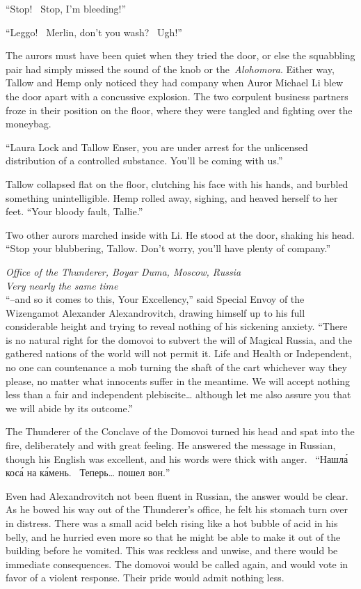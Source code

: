 ``Stop! ~Stop, I'm bleeding!''

``Leggo! ~Merlin, don't you wash? ~Ugh!''

The aurors must have been quiet when they tried the door, or else the
squabbling pair had simply missed the sound of the knob or
the~\emph{Alohomora}. Either way, Tallow and Hemp only noticed they had
company when Auror Michael Li blew the door apart with a concussive
explosion. The two corpulent business partners froze in their position
on the floor, where they were tangled and fighting over the moneybag.

``Laura Lock and Tallow Enser, you are under arrest for the unlicensed
distribution of a controlled substance. You'll be coming with us.''

Tallow collapsed flat on the floor, clutching his face with his hands,
and burbled something unintelligible. Hemp rolled away, sighing, and
heaved herself to her feet. ``Your bloody fault, Tallie.''

Two other aurors marched inside with Li. He stood at the door, shaking
his head. ``Stop your blubbering, Tallow. Don't worry, you'll have
plenty of company.''

\mybreak

\emph{Office of the Thunderer, Boyar Duma, Moscow, Russia}\\
\emph{Very nearly the same time}\\

``--and so it comes to this, Your Excellency,'' said Special Envoy of
the Wizengamot Alexander Alexandrovitch, drawing himself up to his full
considerable height and trying to reveal nothing of his sickening
anxiety. ``There is no natural right for the domovoi to subvert the will
of Magical Russia, and the gathered nations of the world will not permit
it. Life and Health or Independent, no one can countenance a mob turning
the shaft of the cart whichever way they please, no matter what
innocents suffer in the meantime. We will accept nothing less than a
fair and independent plebiscite\ldots{} although let me also assure you
that we will abide by its outcome.''

The Thunderer of the Conclave of the Domovoi turned his head and spat
into the fire, deliberately and with great feeling. He answered the
message in Russian, though his English was excellent, and his words were
thick with anger. ~``\foreignlanguage{russian}{Нашла́ коса́ на ка́мень.
~Теперь\ldots{} пошел вон.}''

Even had Alexandrovitch not been fluent in Russian, the answer would be
clear. As he bowed his way out of the Thunderer's office, he felt his
stomach turn over in distress. There was a small acid belch rising like
a hot bubble of acid in his belly, and he hurried even more so that he
might be able to make it out of the building before he vomited. This was
reckless and unwise, and there would be immediate consequences. The
domovoi would be called again, and would vote in favor of a violent
response. Their pride would admit nothing less.

